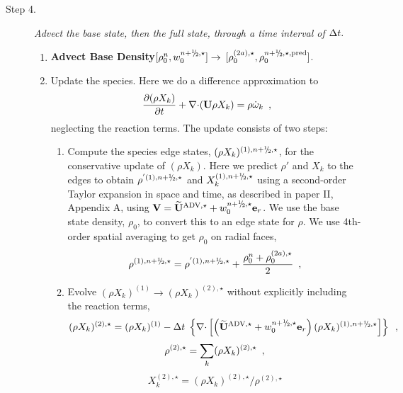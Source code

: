 \begin{description}
\begin{enumerate}
\end{enumerate}

\item[Step 4.] {\em Advect the base state, then the full state, through a time interval 
of $\Delta t.$}

\begin{enumerate}
\renewcommand{\theenumi}{{\bf \alph{enumi}}}

\item {\bf Advect Base Density}$[\rhozero^{n},w_0^{\nph,\star}] \rightarrow$ 
$[\rho_0^{(2a),\star}, \rho_0^{\nph,\star,{\rm pred}}]$.

\item Update the species.  Here we do a difference approximation
  to 
  \begin{equation}
  \frac{\partial (\rho X_k)}{\partial t} + \mathbf{\nabla} \mathbf{\cdot} ({\bf U} \rho X_k) =
         \rho {\dot{\omega}}_k \enskip , \label{eq:species}
  \end{equation}
  neglecting the reaction terms.  The update consists of two steps:

  \begin{enumerate}
  \renewcommand{\labelenumii}{{\bf \roman{enumii}}.}

  \item Compute the species edge states, $(\rho X_k)^{(1),\nph,\star}$,
  for the conservative update of $(\rho X_k)$. 
  Here we predict $\rho'$ and $X_k$ to the edges to obtain 
  $\rho^{'(1),\nph,\star}$ and $X_k^{(1),\nph,\star}$ using a second-order
  Taylor expansion in space and time, as described in paper II,
  Appendix A, using $\Vb = \uadvone+w_0^{\nph,\star} \er$.  We use the base
  state density, $\rho_0$, to convert this to an edge state for $\rho$.
  We use 4th-order spatial averaging to get $\rho_0$ on radial faces,
\begin{equation}
\rho^{(1),\nph,\star} = 
\rho^{'(1),\nph,\star} + \frac{\rho_0^n + \rho_0^{(2a),\star}}{2} \enskip ,
\label{eq:rhoXedgestate}
\end{equation}

  \item Evolve $(\rho X_k)^{(1)} \rightarrow (\rho X_k)^{(2),\star}$
  without explicitly including the reaction terms,
\begin{equation}
(\rho X_k)^{(2),\star} = (\rho X_k)^{(1)} 
 - \dt \; \left\{ \nablab \cdotb \left[ \left(\uadvone+w_0^{\nph,\star} \er\right)  
  (\rho X_k)^{(1),\nph,\star} \right] \right\} \enskip ,
\end{equation}
\begin{equation}
\rho^{(2),\star} = \sum_k (\rho X_k)^{(2),\star} \enskip ,
\end{equation}
\begin{equation}
X_k^{(2),\star} = (\rho X_k)^{(2),\star} / \rho^{(2),\star}
\end{equation}


\end{enumerate}
\end{enumerate}
\end{description}
